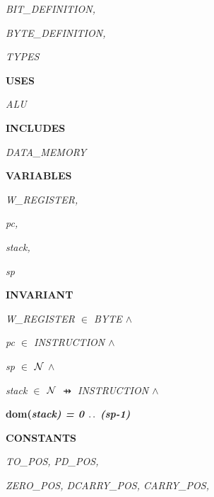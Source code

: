 \begin{sloppypar}
\hspace*{0.20in}\it BIT\_DEFINITION\rm ,

\hspace*{0.20in}\it BYTE\_DEFINITION\rm ,

\hspace*{0.20in}\it TYPES

\vspace*{4mm}
\bf USES

\hspace*{0.20in}\it ALU

\vspace*{4mm}
\bf INCLUDES

\hspace*{0.20in}\it DATA\_MEMORY

\vspace*{4mm}
\bf VARIABLES

\hspace*{0.20in}\it W\_REGISTER\rm ,

\hspace*{0.20in}\it pc\rm ,

\hspace*{0.20in}\it stack\rm ,

\hspace*{0.20in}\it sp

\vspace*{4mm}
\bf INVARIANT

\hspace*{0.20in}\it W\_REGISTER  $\in$  \it BYTE  $\land$ 

\hspace*{0.20in}\it pc  $\in$  \it INSTRUCTION  $\land$ 

\hspace*{0.20in}\it sp  $\in$   $\mbox{${\cal N}$}$   $\land$ 

\hspace*{0.20in}\it stack  $\in$   $\mbox{${\cal N}$}$   $\pfun$  \it INSTRUCTION  $\land$ 

\hspace*{0.20in}\bf dom\rm (\it stack\rm ) \rm = \rm 0 $\mathbin{\ldotp\ldotp}$ \rm (\it sp\rm -\rm 1\rm )

\vspace*{4mm}
\bf CONSTANTS

\hspace*{0.20in} 

\hspace*{0.20in}\it TO\_POS\rm , \it PD\_POS\rm , 

\hspace*{0.20in}\it ZERO\_POS\rm , \it DCARRY\_POS\rm , \it CARRY\_POS\rm ,


\end{sloppypar}
